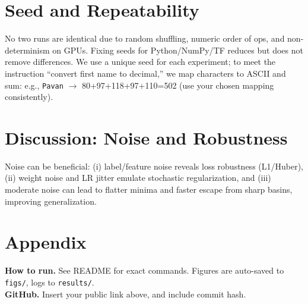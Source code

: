 \documentclass{article}
\begin{document}
\section{Seed and Repeatability}
No two runs are identical due to random shuffling, numeric order of ops, and non-determinism on GPUs. Fixing seeds for Python/NumPy/TF reduces but does not remove differences. We use a unique seed for each experiment; to meet the instruction ``convert first name to decimal,'' we map characters to ASCII and sum: e.g., \texttt{Pavan} $\to$ 80+97+118+97+110=502 (use your chosen mapping consistently).

\section{Discussion: Noise and Robustness}
Noise can be beneficial: (i) label/feature noise reveals loss robustness (L1/Huber), (ii) weight noise and LR jitter emulate stochastic regularization, and (iii) moderate noise can lead to flatter minima and faster escape from sharp basins, improving generalization.

\section{Appendix}
\textbf{How to run.} See README for exact commands. Figures are auto-saved to \texttt{figs/}, logs to \texttt{results/}. \\
\textbf{GitHub.} Insert your public link above, and include commit hash.
\end{document}
